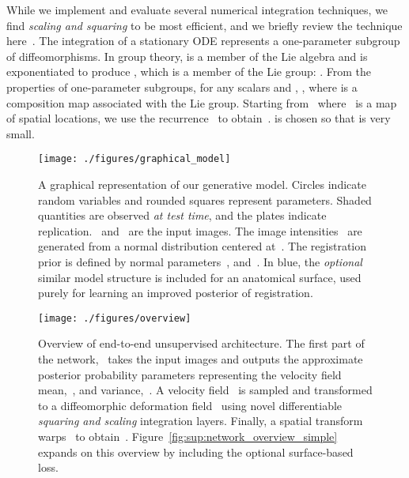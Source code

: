 \documentclass{article}
\newcommand{\citep}{\cite}
\begin{document}
While we implement and evaluate several numerical integration techniques, we find \textit{scaling and squaring} to be most efficient, and we briefly review the technique here~\citep{arsigny2006}.
The integration of a stationary ODE represents a one-parameter subgroup of diffeomorphisms.  In group theory,  is a member of the Lie algebra and is exponentiated to produce , which is a member of the Lie group: .
  From the properties of one-parameter subgroups, for any scalars  and , \mbox{}, where  is a composition map associated with the Lie group. Starting from~ where~ is a map of spatial locations, we use the recurrence~ to obtain~.  is chosen so that  is very small.









\begin{figure}[t!]
	\centering
		\texttt{[image: ./figures/graphical\_model]}
\caption{A graphical representation of our generative model. Circles indicate random variables and rounded squares represent parameters. Shaded quantities are observed \textit{at test time}, and the plates indicate replication.~ and~ are the input images. The image intensities~ are generated from a normal distribution centered at~. The registration prior is defined by normal parameters~, and~. In blue, the \textit{optional} similar model structure is included for an anatomical surface, used purely for learning an improved posterior of registration.}
	\label{fig:graphicalmodel_simple}
\end{figure}

\begin{figure*}[t!]
	\centering
	\begin{center}
	  \texttt{[image: ./figures/overview]}
	\end{center}
	\hfill
	\begin{minipage}[b]{1\linewidth}
		\caption{Overview of end-to-end unsupervised architecture. The first part of the network,~ takes the input images and outputs the approximate posterior probability parameters representing the velocity field mean,~, and variance,~. A velocity field~ is sampled and transformed to a diffeomorphic deformation field~ using novel differentiable \textit{squaring and scaling} integration layers. Finally, a spatial transform warps~ to obtain~. Figure~\ref{fig:sup:network_overview_simple} expands on this overview by including the optional surface-based loss.
		}
		\label{fig:network_overview_simple}
	\end{minipage}
\end{figure*}
\end{document}
